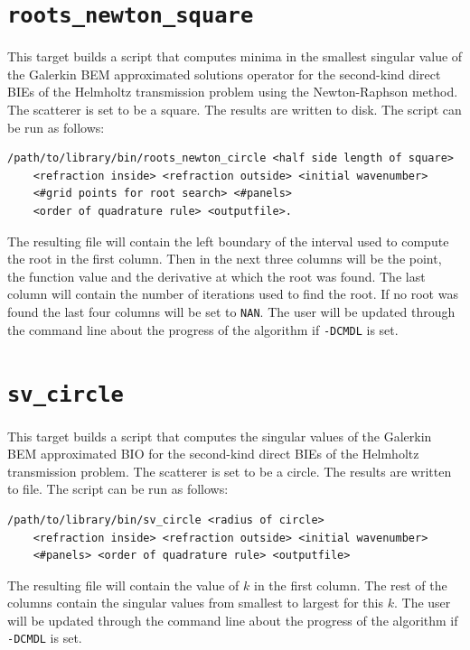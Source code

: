 \documentclass[a4paper, oneside]{discothesis}
\begin{document}
\cprotect\section{\verb|roots_newton_square|}
This target builds a script that computes minima in the smallest singular value of the
Galerkin BEM approximated solutions operator for the second-kind direct BIEs of the Helmholtz
transmission problem using the Newton-Raphson method.
The scatterer is set to be a square.
The results are written to disk.
The script can be run as follows:
\begin{verbatim}
/path/to/library/bin/roots_newton_circle <half side length of square> 
	<refraction inside> <refraction outside> <initial wavenumber> 
	<#grid points for root search> <#panels> 
	<order of quadrature rule> <outputfile>.
\end{verbatim}
The resulting file will contain the left boundary of the interval used to compute the root in the first column. 
Then in the next three columns will be the point, the function value and the derivative at which the root was found.
The last column will contain the number of iterations used to find the root.
If no root was found the last four columns will be set to \verb|NAN|.
The user will be updated through the command line about the progress of the algorithm if \verb|-DCMDL| is set.

\cprotect\section{\verb|sv_circle|}
This target builds a script that computes the singular values
of the Galerkin BEM approximated BIO for the
second-kind direct BIEs of the Helmholtz
transmission problem.
The scatterer is set to be a circle.
The results are written to file.
The script can be run as follows:
\begin{verbatim}
/path/to/library/bin/sv_circle <radius of circle> 
	<refraction inside> <refraction outside> <initial wavenumber>
	<#panels> <order of quadrature rule> <outputfile>
\end{verbatim}
The resulting file will contain the value of $k$ in the first column.
The rest of the columns contain the singular values from smallest to largest for this $k$.
The user will be updated through the command line about the progress of the algorithm if \verb|-DCMDL| is set.
\end{document}
